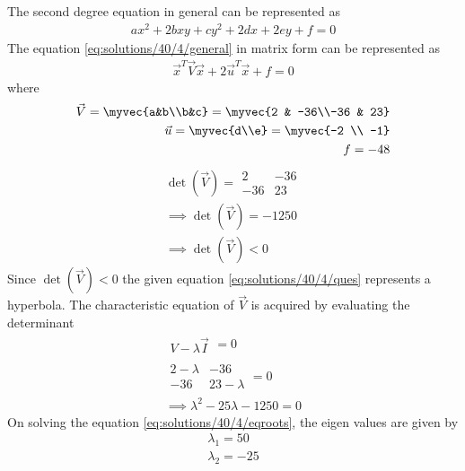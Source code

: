 
The second degree equation in general can be represented as
\begin{align}
    ax^2+2bxy+cy^2+2dx+2ey+f=0\label{eq:solutions/40/4/general}
\end{align}
The equation \eqref{eq:solutions/40/4/general} in matrix form can be represented as 
\begin{align}
\vec{x}^T\vec{V}\vec{x}+2\vec{u}^T\vec{x}+f=0\label{eq:solutions/40/4/given}
\end{align}
where 
\begin{align}
\vec{V}=\myvec{a&b\\b&c}=\myvec{2 & -36\\-36 & 23}\\
\vec{u}=\myvec{d\\e}=\myvec{-2 \\ -1}\\
f=-48
\end{align}
\begin{align}
    \det(\vec{V})=\begin{array}{|cc|} 2 & -36\\-36 & 23 \end{array}\\
\implies\det(\vec{V})=-1250\\
\implies\det(\vec{V})<0
\end{align}
Since $\det(\vec{V})<0$ the given equation \eqref{eq:solutions/40/4/ques} represents a hyperbola. The characteristic equation of $\vec{V}$ is acquired by evaluating the determinant 
\begin{align}
       \begin{array}{|c|}
V-\lambda\vec{I}
\end{array}=0\\
   \begin{array}{|cc|}
2-\lambda & -36 \\ -36 & 23-\lambda
\end{array}=0\\
\implies \lambda^2-25\lambda-1250=0\label{eq:solutions/40/4/eqroots}
\end{align}
On solving the equation \eqref{eq:solutions/40/4/eqroots}, the eigen values are given by 
\begin{align}
    \lambda_1=50\label{eq:solutions/40/4/eqeig1}\\
    \lambda_2=-25\label{eq:solutions/40/4/eqeig2}
\end{align}
